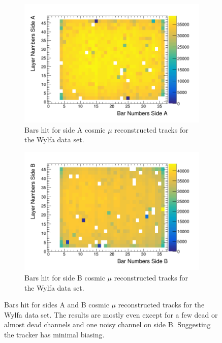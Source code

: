 \begin{figure}[htbp]
\centering
\begin{subfigure}{.5\textwidth}
  \centering
  \includegraphics[width=\linewidth]{Chapter5/Figs/wylfaRasterNew/wylfaSideAHits.png}
  \captionsetup{width=.9\linewidth}
  \caption{Bars hit for side A cosmic $\mu$ reconstructed tracks for the Wylfa data set.}
  \label{subFig:wylfaSideAHits}
\end{subfigure}%
\begin{subfigure}{.5\textwidth}
  \centering
\includegraphics[width=\linewidth]{Chapter5/Figs/wylfaRasterNew/wylfaSideBHits.png}
  \captionsetup{width=.9\linewidth}
  \caption{Bars hit for side B cosmic $\mu$ reconstructed tracks for the Wylfa data set.}
  \label{subFig:wylfaSideBHits}
\end{subfigure}
\caption{Bars hit for sides A and B cosmic $\mu$ reconstructed tracks for the Wylfa data set. The results are mostly even except for a few dead or almost dead channels and one noisy channel on side B. Suggesting the tracker has minimal biasing.}
\label{fig:wylfaSideABHits}
\end{figure}

